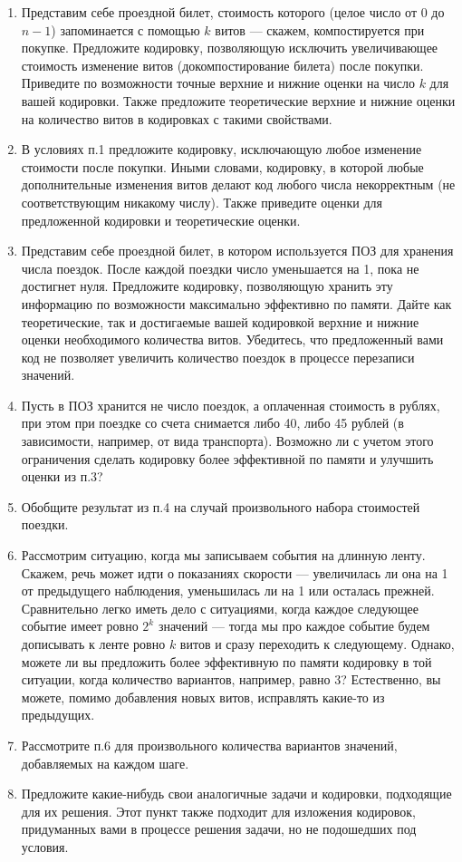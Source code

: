 \begin{enumerate}
\item Представим себе проездной билет, стоимость которого (целое число от 0 до $n-1$) 
запоминается с помощью $k$ витов --- скажем, компостируется при покупке. Предложите кодировку, 
позволяющую исключить увеличивающее стоимость изменение витов (докомпостирование билета)
после покупки. Приведите по возможности точные верхние и нижние оценки на число $k$ для вашей кодировки. Также предложите 
теоретические верхние и нижние оценки на количество витов в кодировках с такими свойствами.
\item В условиях п.1 предложите кодировку, исключающую любое изменение стоимости после покупки.
Иными словами, кодировку, в которой любые дополнительные изменения витов делают код любого
числа некорректным (не соответствующим никакому числу). Также приведите оценки для предложенной 
кодировки и теоретические оценки.
\item Представим себе проездной билет, в котором используется ПОЗ для хранения числа поездок.
После каждой поездки число уменьшается на 1, пока не достигнет нуля. Предложите кодировку, 
позволяющую хранить эту информацию по возможности максимально эффективно по памяти. Дайте 
как теоретические, так и достигаемые вашей кодировкой верхние и нижние оценки необходимого количества 
витов.
Убедитесь, что предложенный вами код не позволяет увеличить количество поездок в процессе
перезаписи значений.
\item Пусть в ПОЗ хранится не число поездок, а оплаченная стоимость в рублях, при этом 
при поездке со счета снимается либо 40, либо 45 рублей (в зависимости, например, от вида
транспорта). Возможно ли с учетом этого ограничения сделать кодировку более эффективной по
памяти и улучшить оценки из п.3?
\item Обобщите результат из п.4 на случай произвольного набора стоимостей поездки.
\item Рассмотрим ситуацию, когда мы записываем события на длинную ленту. Скажем, речь может
идти о показаниях скорости --- увеличилась ли она на 1 от предыдущего наблюдения, 
уменьшилась ли на 1 или осталась прежней. Сравнительно легко иметь дело с ситуациями, когда
каждое следующее событие имеет ровно $2^k$ значений --- тогда мы про каждое событие будем 
дописывать к ленте ровно $k$ витов и сразу переходить к следующему. 
Однако, можете ли вы предложить более эффективную по памяти кодировку в той ситуации, 
когда количество вариантов, например, равно 3? Естественно, вы можете, помимо добавления 
новых витов, исправлять какие-то из предыдущих.
\item Рассмотрите п.6 для произвольного количества вариантов значений, добавляемых на каждом шаге.
\item Предложите какие-нибудь свои аналогичные задачи и кодировки, подходящие для их решения. Этот пункт также подходит для изложения кодировок, придуманных вами в процессе решения задачи, но не подошедших под условия.
\end{enumerate}
